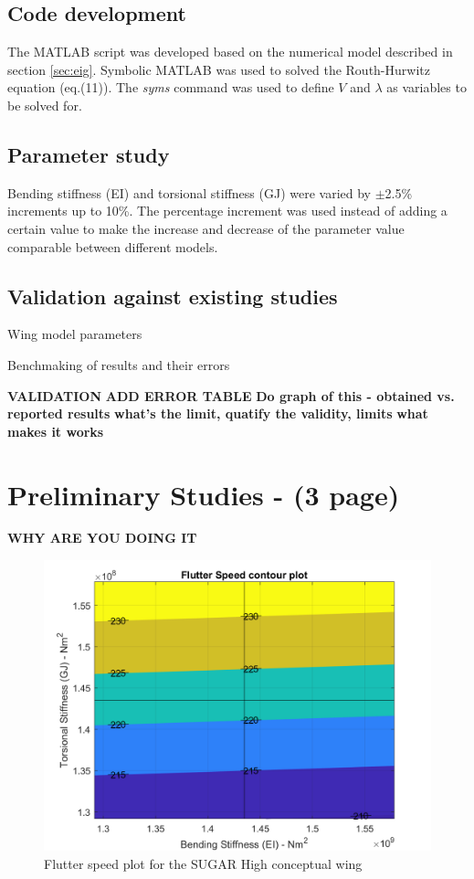 \documentclass[11pt]{article}
\begin{document}
\subsection{Code development}
The MATLAB script was developed based on the numerical model described in section \ref{sec:eig}. Symbolic MATLAB was used to solved the Routh-Hurwitz equation (eq.(11)). The \textit{syms} command was used to define $V$ and $\lambda$ as variables to be solved for.        

\subsection{Parameter study}
Bending stiffness (EI) and torsional stiffness (GJ) were varied by $\pm$2.5\% increments up to 10\%. The percentage increment was used instead of adding a certain value to make the increase and decrease of the parameter value comparable between different models. 

\subsection{Validation against existing studies}
\begin{table}[H]
    \centering
    \caption{Wing model parameters}
    
    \label{tab:data}
\end{table}

\begin{table}[H]
    \centering
    \caption{Benchmaking of results and their errors}
    
    \label{tab:error}
\end{table}

\textbf{VALIDATION}
\textbf{ADD ERROR TABLE}
\textbf{Do graph of this - obtained vs. reported results}
\textbf{what's the limit, quatify the validity, limits}
\textbf{what makes it works}
\cleardoublepage

\section{Preliminary Studies - (3 page)}
\textbf{WHY ARE YOU DOING IT}
\begin{figure}[H]
    \centering
    \includegraphics[width = .7\textwidth]{figures/SUGAR_flutter.png}
    \caption{Flutter speed plot for the SUGAR High conceptual wing}
    \label{fig:SUGAR-flutter}
\end{figure}
\end{document}
